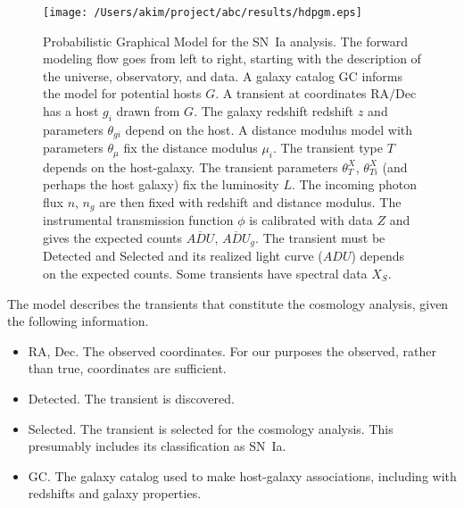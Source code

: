 \documentclass[preprint]{aastex}
\begin{document}
\begin{figure}[htbp] %
   \centering
   \texttt{[image: /Users/akim/project/abc/results/hdpgm.eps]} 
   \caption{Probabilistic Graphical Model for the SN~Ia analysis.  
   The forward modeling
   flow goes from left to right, starting with the description of the universe, observatory,
   and data.
   A galaxy catalog GC informs the model for potential hosts $G$.  A transient
   at coordinates  $\text{RA/Dec}$  has a host $g_i$ drawn from $G$.
   The galaxy redshift redshift $z$ and parameters $\theta_{gi}$ depend on the host.
   A distance modulus model with parameters $\theta_\mu$ fix the distance modulus $\mu_i$.
   The transient type $T$ depends on the host-galaxy.   The transient
   parameters $\theta_T^X$, $\theta_{Ti}^X$ (and perhaps the host galaxy) fix the luminosity $L$.       The 
   incoming photon flux $n$, $n_g$  are then fixed
   with redshift and distance modulus.
   The instrumental transmission function $\phi$ is calibrated with data ${Z}$ and
   gives the expected
   counts $\overline{\mathit{ADU}}$, $\overline{\mathit{ADU}}_g$. 
   The transient must be Detected and Selected and its realized light curve (${ADU}$) depends on the expected counts.  Some transients have spectral data
   ${X}_S$.
   \label{pgm:fig}}
\end{figure}


The model describes the transients that constitute the cosmology analysis, given the following
information.  
\begin{itemize}
\item ${\text{RA}}$, ${\text{Dec}}$.  The observed
coordinates.  For our purposes the observed, rather than true, coordinates are sufficient.
\item Detected.  The transient is discovered.
\item Selected. The transient is selected for the cosmology analysis.  This presumably
includes its classification as SN~Ia.
\item GC.  The galaxy catalog used to make host-galaxy associations, including with
redshifts and galaxy properties.
\end{itemize}
\end{document}
